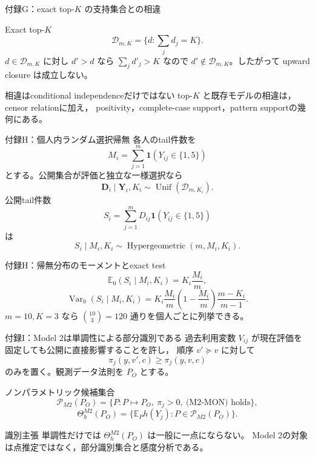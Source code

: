 \documentclass[aspectratio=169,10pt]{beamer}
\newcommand{\E}{\mathbb{E}}
\newcommand{\1}{\mathbf{1}}
\newcommand{\Y}{\bm{Y}}
\newcommand{\D}{\bm{D}}
\newcommand{\Var}{\operatorname{Var}}
\newcommand{\Unif}{\operatorname{Unif}}
\begin{document}
\begin{frame}{付録G：exact top-$K$ の支持集合との相違}
\begin{block}{Exact top-$K$}
\scriptsize
\[
\mathcal D_{m,K}=\{d:\sum_jd_j=K\}.
\]
$d\in\mathcal D_{m,K}$ に対し $d'>d$ なら $\sum_jd'_j>K$ なので
$d'\notin\mathcal D_{m,K}$。したがって upward closure は成立しない。
\end{block}
\begin{alertblock}{相違はconditional independenceだけではない}
top-$K$ と既存モデルの相違は，censor relationに加え，
positivity，complete-case support，pattern supportの幾何にある。
\end{alertblock}
\end{frame}

\begin{frame}{付録H：個人内ランダム選択帰無}
各人のtail件数を
\[
M_i=\sum_{j=1}^{m}\1(Y_{ij}\in\{1,5\})
\]
とする。公開集合が評価と独立な一様選択なら
\[
\D_i\mid\Y_i,K_i
\sim\Unif(\mathcal D_{m,K_i}).
\]
公開tail件数
\[
S_i=\sum_{j=1}^{m}D_{ij}\1(Y_{ij}\in\{1,5\})
\]
は
\[
S_i\mid M_i,K_i
\sim\operatorname{Hypergeometric}(m,M_i,K_i).
\]
\end{frame}

\begin{frame}{付録H：帰無分布のモーメントとexact test}
\[
\E_0(S_i\mid M_i,K_i)=K_i\frac{M_i}{m},
\]
\[
\Var_0(S_i\mid M_i,K_i)
=K_i\frac{M_i}{m}\left(1-\frac{M_i}{m}\right)
\frac{m-K_i}{m-1}.
\]
$m=10,K=3$ なら $\binom{10}{3}=120$ 通りを個人ごとに列挙できる。
\end{frame}

\begin{frame}{付録I：Model 2は単調性による部分識別である}
過去利用変数 $V_{ij}$ が現在評価を固定しても公開に直接影響することを許し，
順序 $v'\succeq v$ に対して
\[
\pi_j(y,v',c)\ge\pi_j(y,v,c)
\tag{M2-MON}
\]
のみを置く。観測データ法則を $P_O$ とする。
\begin{block}{ノンパラメトリック候補集合}
\scriptsize
\[
\mathcal P_{M2}(P_O)
=\{P:P\mapsto P_O,\ \pi_j>0,\ \text{(M2-MON) holds}\},
\]
\[
\Theta_h^{M2}(P_O)
=\{\E_Ph(Y_j):P\in\mathcal P_{M2}(P_O)\}.
\]
\end{block}
\begin{alertblock}{識別主張}
単調性だけでは $\Theta_h^{M2}(P_O)$ は一般に一点にならない。
Model 2の対象は点推定ではなく，部分識別集合と感度分析である。
\end{alertblock}
\end{frame}
\end{document}
